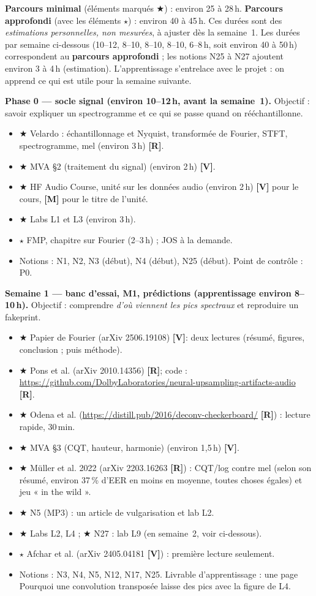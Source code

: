 \documentclass[11pt,a4paper]{article}
\newcommand{\sV}{\textbf{[V]}}
\newcommand{\sR}{\textbf{[R]}}
\newcommand{\sM}{\textbf{[M]}}
\newcommand{\smin}{$\bigstar$}   %
\newcommand{\sapp}{$\star$}      %
\begin{document}
\textbf{Parcours minimal} (éléments marqués \smin{}) : environ 25 à 28\,h. \textbf{Parcours approfondi} (avec les éléments \sapp{}) : environ 40 à 45\,h. Ces durées sont des \emph{estimations personnelles, non mesurées}, à ajuster dès la semaine~1. Les durées par semaine ci-dessous (10--12, 8--10, 8--10, 8--10, 6--8\,h, soit environ 40 à 50\,h) correspondent au \textbf{parcours approfondi} ; les notions N25 à N27 ajoutent environ 3 à 4\,h (estimation). L'apprentissage s'entrelace avec le projet : on apprend ce qui est utile pour la semaine suivante.

\textbf{Phase 0 --- socle signal (environ 10--12\,h, avant la semaine~1).} Objectif : savoir expliquer un spectrogramme et ce qui se passe quand on rééchantillonne.
\begin{itemize}
  \item \smin{} Velardo : échantillonnage et Nyquist, transformée de Fourier, STFT, spectrogramme, mel (environ 3\,h) \sR.
  \item \smin{} MVA \S2 (traitement du signal) (environ 2\,h) \sV.
  \item \smin{} HF Audio Course, unité sur les données audio (environ 2\,h) \sV{} pour le cours, \sM{} pour le titre de l'unité.
  \item \smin{} Labs L1 et L3 (environ 3\,h).
  \item \sapp{} FMP, chapitre sur Fourier (2--3\,h) ; JOS à la demande.
  \item Notions : N1, N2, N3 (début), N4 (début), N25 (début). Point de contrôle : P0.
\end{itemize}

\textbf{Semaine 1 --- banc d'essai, M1, prédictions (apprentissage environ 8--10\,h).} Objectif : comprendre \emph{d'où viennent les pics spectraux} et reproduire un fakeprint.
\begin{itemize}
  \item \smin{} Papier de Fourier (arXiv 2506.19108) \sV : deux lectures (résumé, figures, conclusion ; puis méthode).
  \item \smin{} Pons et al. (arXiv 2010.14356) \sR ; code : \url{https://github.com/DolbyLaboratories/neural-upsampling-artifacts-audio} \sR.
  \item \smin{} Odena et al. (\url{https://distill.pub/2016/deconv-checkerboard/} \sR) : lecture rapide, 30\,min.
  \item \smin{} MVA \S3 (CQT, hauteur, harmonie) (environ 1,5\,h) \sV.
  \item \smin{} Müller et al. 2022 (arXiv 2203.16263 \sR) : CQT/log contre mel (selon son résumé, environ 37\,\% d'EER en moins en moyenne, toutes choses égales) et jeu « in the wild ».
  \item \smin{} N5 (MP3) : un article de vulgarisation et lab L2.
  \item \smin{} Labs L2, L4 ; \smin{} N27 : lab L9 (en semaine~2, voir ci-dessous).
  \item \sapp{} Afchar et al. (arXiv 2405.04181 \sV) : première lecture seulement.
  \item Notions : N3, N4, N5, N12, N17, N25. Livrable d'apprentissage : une page \og Pourquoi une convolution transposée laisse des pics \fg{} avec la figure de L4.
\end{itemize}
\end{document}
